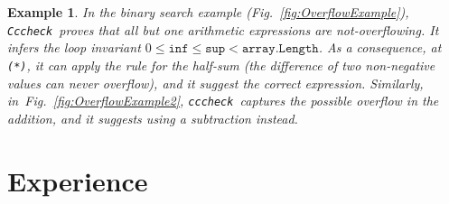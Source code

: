 \documentclass[10pt]{sigplanconf}
\newtheorem{example}{Example}
\newcommand{\refFig}[1]{Fig.~\ref{fig:#1}}
\newcommand{\code}[1]{\texttt{#1}}
\newcommand{\clousot}{\code{cccheck}}
\newcommand{\Clousot}{\code{Cccheck}}
\begin{document}
\begin{example}\normalfont
In the binary search example (\refFig{OverflowExample}), \Clousot\
proves that all but one arithmetic expressions are not-overflowing.
It infers the loop invariant $0 \leq \code{inf} \leq \code{sup} <
\code{array.Length}$.  As a consequence, at \code{(*)}, it can apply
the rule for the half-sum (the difference of two non-negative values
can never overflow), and it suggest the correct expression.
Similarly, in~\refFig{OverflowExample2}, \clousot\ captures the
possible overflow in the addition, and it suggests using a subtraction
instead.
\end{example}

\section{Experience}
\label{sec:experience}
\end{document}
